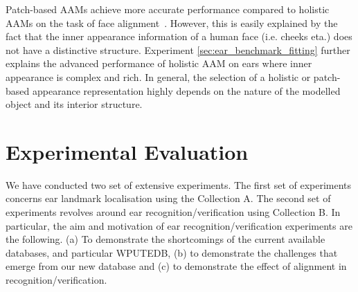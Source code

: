 Patch-based AAMs achieve more accurate performance compared to holistic AAMs on the task of face alignment~\cite{Tzimiropoulos2014}. However, this is easily explained by the fact that the inner appearance information of a human face (i.e. cheeks eta.) does not have a distinctive structure. Experiment \ref{sec:ear_benchmark_fitting} further explains the advanced performance of holistic AAM on ears where inner appearance is complex and rich. In general, the selection of a holistic or patch-based appearance representation highly depends on the nature of the modelled object and its interior structure. 






\section{Experimental Evaluation}

We have conducted two set of extensive experiments. The first set of experiments concerns ear landmark localisation using the Collection A. The second set of experiments revolves around ear recognition/verification using Collection B. In particular, the aim and motivation of ear recognition/verification experiments are the following. (a) To demonstrate the shortcomings of the current available databases, and particular WPUTEDB, (b) to demonstrate the challenges that emerge from our new database and (c) to demonstrate the effect of alignment in recognition/verification.  



